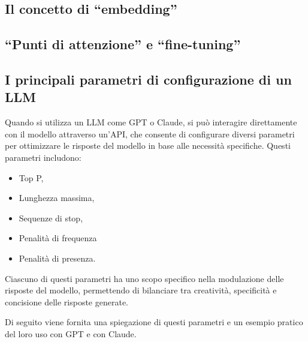     \subsection{Il concetto di ``embedding''}
        
    \subsection{``Punti di attenzione'' e ``fine-tuning''}
    
    \subsection{I principali parametri di configurazione di un LLM}
        Quando si utilizza un LLM come GPT o Claude, si può interagire direttamente con il modello attraverso un'API, che consente di configurare diversi parametri per ottimizzare le risposte del modello in base alle necessità specifiche. Questi parametri includono:
        \begin{itemize}
            \item Top P,
            \item Lunghezza massima,
            \item Sequenze di stop,
            \item Penalità di frequenza
            \item Penalità di presenza.
        \end{itemize}
        
        Ciascuno di questi parametri ha uno scopo specifico nella modulazione delle risposte del modello, permettendo di bilanciare tra creatività, specificità e concisione delle risposte generate.
        
        Di seguito viene fornita una spiegazione di questi parametri e un esempio pratico del loro uso con GPT e con Claude.
        
